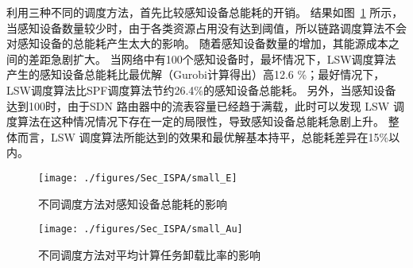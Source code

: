 利用三种不同的调度方法，首先比较感知设备总能耗的开销。
结果如图~\ref{fig_smallE} 所示，当感知设备数量较少时，由于各类资源占用没有达到阈值，所以链路调度算法不会对感知设备的总能耗产生太大的影响。
随着感知设备数量的增加，其能源成本之间的差距急剧扩大。
当网络中有100个感知设备时，最坏情况下，LSW调度算法产生的感知设备总能耗比最优解（Gurobi计算得出）高12.6 \%；最好情况下，LSW调度算法比SPF调度算法节约26.4\%的感知设备总能耗。
另外，当感知设备达到100时，由于SDN 路由器中的流表容量已经趋于满载，此时可以发现 LSW 调度算法在这种情况情况下存在一定的局限性，导致感知设备总能耗急剧上升。
整体而言，LSW 调度算法所能达到的效果和最优解基本持平，总能耗差异在15\%以内。

\begin{figure}[!t]
  \centering
  \texttt{[image: ./figures/Sec\_ISPA/small\_E]}
  \vspace{-1em}
  \caption{不同调度方法对感知设备总能耗的影响}
  \label{fig_smallE}
\end{figure}


\begin{figure}[!h]
  \centering
  \texttt{[image: ./figures/Sec\_ISPA/small\_Au]}
  \vspace{-0.5em}
  \caption{不同调度方法对平均计算任务卸载比率的影响}
  \vspace{-0.5em}
  \label{fig_smallAu}
\end{figure}

